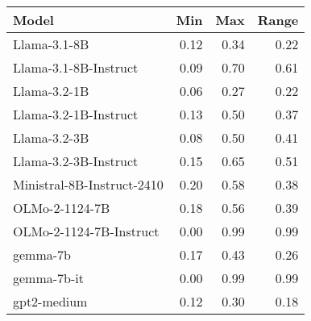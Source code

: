 \begin{tabular}{lrrr}
\toprule
Model & Min & Max & Range \\
\midrule
Llama-3.1-8B & 0.12 & 0.34 & 0.22 \\
Llama-3.1-8B-Instruct & 0.09 & 0.70 & 0.61 \\
Llama-3.2-1B & 0.06 & 0.27 & 0.22 \\
Llama-3.2-1B-Instruct & 0.13 & 0.50 & 0.37 \\
Llama-3.2-3B & 0.08 & 0.50 & 0.41 \\
Llama-3.2-3B-Instruct & 0.15 & 0.65 & 0.51 \\
Ministral-8B-Instruct-2410 & 0.20 & 0.58 & 0.38 \\
OLMo-2-1124-7B & 0.18 & 0.56 & 0.39 \\
OLMo-2-1124-7B-Instruct & 0.00 & 0.99 & 0.99 \\
gemma-7b & 0.17 & 0.43 & 0.26 \\
gemma-7b-it & 0.00 & 0.99 & 0.99 \\
gpt2-medium & 0.12 & 0.30 & 0.18 \\
\bottomrule
\end{tabular}
